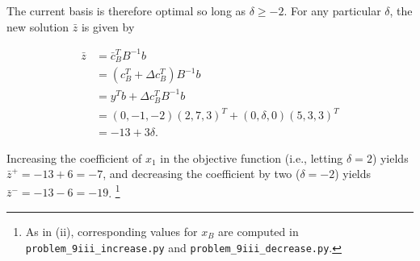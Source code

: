 \begin{solution}
  The current basis is therefore optimal so long as $\delta \ge -2$. For any particular $\delta$, the new solution 
  $\bar{z}$ is given by

  \begin{align*}
  \bar{z} &= \bar{c}_B^T B^{-1} b \\
          &= \left(c_B^T + \Delta c_B^T \right) B^{-1} b \\
          &= y^T b + \Delta c_B^T B^{-1} b \\
          &= (0, -1, -2)(2, 7,  3)^T + (0, \delta, 0)(5, 3, 3)^T \\
          &= -13 + 3\delta.
  \end{align*}

  Increasing the coefficient of $x_1$ in the objective function (i.e., letting $\delta = 2$) yields 
  $\bar{z}^+ = -13 + 6 = -7$, and decreasing the coefficient by two ($\delta = -2$) yields $\bar{z}^- = -13 - 6 = -19$.
  \footnote{
    As in (ii), corresponding values for $x_B$ are computed in \texttt{problem\_9iii\_increase.py} and 
    \texttt{problem\_9iii\_decrease.py}.
  }
  \ \\
  \vfill
\end{solution}
